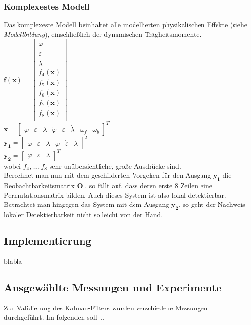 \documentclass[times, 10pt,twocolumn]{article}
\begin{document}
	\subsubsection{Komplexestes Modell}
	Das komplexeste Modell beinhaltet alle modellierten physikalischen Effekte (siehe \textit{Modellbildung}), einschließlich der dynamischen Trägheitsmomente. \\
	$\bm f(\bm x) = \begin{bmatrix}
	\dot \varphi \\
	\dot \varepsilon \\
	\dot \lambda  \\
	f_4(\bm x) \\ 
	f_5(\bm x) \\
	f_6(\bm x) \\
	f_7(\bm x) \\
	f_8(\bm x) \\
	\end{bmatrix} $ \\ 
	$\bm x = \begin{bmatrix}
	\varphi & \varepsilon & \lambda & \dot \varphi & \dot \varepsilon & \dot \lambda & \omega_f & \omega_b
	\end{bmatrix}^T $ \\ 
	$\bm {y_1} = \begin{bmatrix}
	\varphi & \varepsilon & \lambda & \dot \varphi & \dot \varepsilon & \dot \lambda
	\end{bmatrix}^T $ \\
	$\bm {y_2} = \begin{bmatrix}
	\varphi & \varepsilon & \lambda 
	\end{bmatrix}^T $ \\ wobei $f_4, ..., f_8$ sehr unübersichtliche, große Ausdrücke sind. \\
	Berechnet man nun mit dem geschilderten Vorgehen für den Ausgang $\bm{y_1}$
	die Beobachtbarkeitsmatrix $\bm O$ , so fällt auf, dass deren erste 8 Zeilen eine Permutationsmatrix bilden. Auch dieses System ist also lokal detektierbar. 
	Betrachtet man hingegen das System mit dem Ausgang $\bm{y_2}$, so geht der Nachweis lokaler Detektierbarkeit nicht so leicht von der Hand. 
	\subsection{Implementierung}
	blabla 
	\subsection{Ausgewählte Messungen und Experimente}
	Zur Validierung des Kalman-Filters wurden verschiedene Messungen durchgeführt. Im folgenden soll ...
	


\nocite{ex1, ex2}
\end{document}
